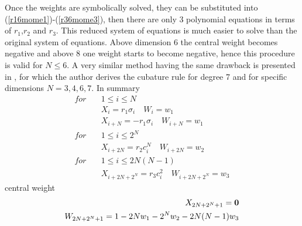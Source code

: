 \documentclass[letterpaper, 10 pt, conference]{ieeeconf}  %
\begin{document}
\setlength{\arraycolsep}{5pt}
Once the weights are symbolically solved, they can be substituted into (\ref{r16mome1})-(\ref{r36mome3}), then there are only 3 polynomial equations in terms of $r_1$,$r_2$ and $r_3$. This reduced system of equations is much easier to solve than the original system of equations. Above dimension 6 the central weight becomes negative and above 8 one weight starts to become negative, hence this procedure is valid for $N\le6$. A very similar method having the same drawback is presented in \cite{c12}, for which the author derives the cubature rule for degree 7 and for specific dimensions $N=3,4,6,7$. 
In summary
\setlength{\arraycolsep}{0.0em}
\begin{eqnarray}
for\quad &1\le i\le N\\
&X_i=r_1\sigma_i \quad W_i=w_1\\
&X_{i+N}=-r_1\sigma_i \quad W_{i+N}=w_1\\
for \quad &1 \le i \le 2^N\\
&X_{i+2N}=r_2c^N_i \quad W_{i+2N}=w_2\\
for \quad &1 \le i \le 2N(N-1)\\
&X_{i+2N+2^N}=r_3c^2_i \quad W_{i+2N+2^N}=w_3
\end{eqnarray}
\setlength{\arraycolsep}{5pt}
central weight
\setlength{\arraycolsep}{0.0em}
\begin{eqnarray}
X_{2N+2^N+1}={\bf 0} \\
W_{2N+2^N+1}=1-2Nw_1-2^Nw_2-2N(N-1)w_3
\end{eqnarray}
\setlength{\arraycolsep}{5pt}
 
\end{document}

